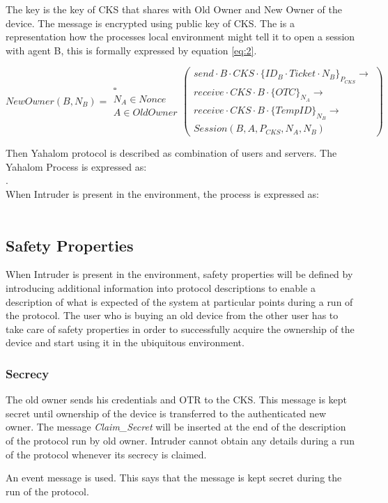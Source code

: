 \documentclass[letterpaper]{article}
\begin{document}
The key  is the key of CKS that shares with Old Owner and New Owner of the device. The message is encrypted using public key of CKS. The  is a representation how the processes local environment might tell it to open a session with agent B, this is formally expressed by equation \eqref{eq:2}.
\begin{figure*}[bpht!]
\begin{dmath}\label{eq:2}
NewOwner(B,N_{B})= \begin{array}{c} \square \\N_{A}\in Nonce \\ A \in OldOwner \end{array} \left(\begin{array}{c} send \cdot B \cdot CKS \cdot \{ID_{B} \cdot Ticket \cdot N_{B}\}_{P_{CKS}}     \rightarrow \\ receive \cdot CKS \cdot B \cdot \{OTC\}_{N_{A}} \rightarrow \\
receive\cdot CKS \cdot B \cdot  \{TempID\}_{N_{B}} \rightarrow \\ 
Session(B,A,P_{CKS},N_{A},N_{B})\end{array} \right)
\end{dmath}
\end{figure*}

Then Yahalom protocol is described as combination of users and servers. The Yahalom Process is expressed as:\\

.\\

When Intruder is present in the environment, the process is expressed as:\\
\\

\subsection{Safety Properties}
When Intruder is present in the environment, safety properties will be defined by introducing additional information into protocol descriptions to enable a description of what is expected of the system at particular points during a run of the protocol. The user who is buying an old device from the other user has to take care of safety properties in order to successfully acquire the ownership of the device and start using it in the ubiquitous environment.
\subsubsection{Secrecy}	
The old owner sends his credentials and OTR to the CKS.	This message is kept secret until ownership of the device is transferred to the authenticated new owner. The message \textit{Claim\_Secret} will be inserted at the end of the description of the protocol run by old owner. Intruder cannot obtain any details during a run of the protocol whenever its secrecy is claimed.
\par An event  message is used. This says that the message is kept secret during the run of the protocol.
\end{document}
